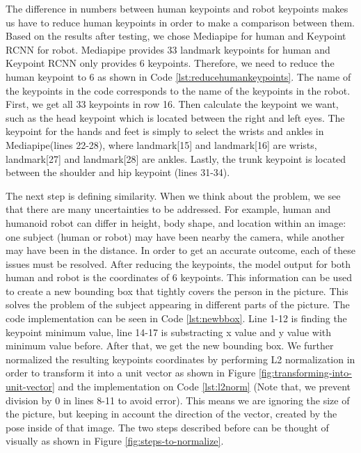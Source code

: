 The difference in numbers between human keypoints and robot keypoints makes us have to reduce human keypoints in order to make a comparison between them.
Based on the results after testing, we chose Mediapipe for human and Keypoint RCNN for robot. Mediapipe provides 33 landmark keypoints for human and Keypoint RCNN only provides 6 keypoints.
Therefore, we need to reduce the human keypoint to 6 as shown in Code \ref{lst:reducehumankeypoints}.
The name of the keypoints in the code corresponds to the name of the keypoints in the robot. First, we get all 33 keypoints in row 16. Then calculate the keypoint we want, such as the head keypoint which is located between the right and left eyes.
The keypoint for the hands and feet is simply to select the wrists and ankles in Mediapipe(lines 22-28), where landmark[15] and landmark[16] are wrists, landmark[27] and landmark[28] are ankles. Lastly, the trunk keypoint is located between the shoulder and hip keypoint (lines 31-34).



The next step is defining similarity. When we think about the problem, we see that there are many uncertainties to be addressed. For example, human and humanoid robot can differ in height, body shape, and location within an image: one subject (human or robot) may have been nearby the camera,
while another may have been in the distance. In order to get an accurate outcome, each of these issues must be resolved.
After reducing the keypoints, the model output for both human and robot is the coordinates of 6 keypoints. This information can be used to create a new bounding box that tightly covers the person in the picture. This solves the problem of the subject appearing in different parts of the picture.
The code implementation can be seen in Code \ref{lst:newbbox}. Line 1-12 is finding the keypoint minimum value, line 14-17 is substracting x value and y value with minimum value before. After that, we get the new bounding box.
We further normalized the resulting keypoints coordinates by performing L2 normalization in order to transform it into a unit vector as shown in Figure \ref{fig:transforming-into-unit-vector} and the implementation on Code \ref{lst:l2norm} (Note that, we prevent division by 0 in lines 8-11 to avoid error).
This means we are ignoring the size of the picture, but keeping in account the direction of the vector, created by the pose inside of that image.
The two steps described before can be thought of visually as shown in Figure \ref{fig:steps-to-normalize}.

